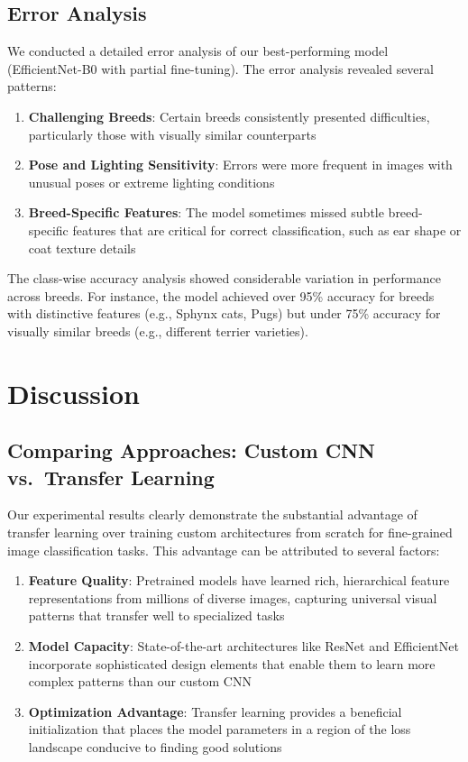 \documentclass[
]{article}
\providecommand{\tightlist}{%
  \setlength{\itemsep}{0pt}\setlength{\parskip}{0pt}}\usepackage{longtable,booktabs,array}
\begin{document}
\subsection{Error Analysis}\label{error-analysis}

We conducted a detailed error analysis of our best-performing model
(EfficientNet-B0 with partial fine-tuning). The error analysis revealed
several patterns:

\begin{enumerate}
\def\labelenumi{\arabic{enumi}.}
\tightlist
\item
  \textbf{Challenging Breeds}: Certain breeds consistently presented
  difficulties, particularly those with visually similar counterparts
\item
  \textbf{Pose and Lighting Sensitivity}: Errors were more frequent in
  images with unusual poses or extreme lighting conditions
\item
  \textbf{Breed-Specific Features}: The model sometimes missed subtle
  breed-specific features that are critical for correct classification,
  such as ear shape or coat texture details
\end{enumerate}

The class-wise accuracy analysis showed considerable variation in
performance across breeds. For instance, the model achieved over 95\%
accuracy for breeds with distinctive features (e.g., Sphynx cats, Pugs)
but under 75\% accuracy for visually similar breeds (e.g., different
terrier varieties).

\section{Discussion}\label{discussion}

\subsection{Comparing Approaches: Custom CNN vs.~Transfer
Learning}\label{comparing-approaches-custom-cnn-vs.-transfer-learning}

Our experimental results clearly demonstrate the substantial advantage
of transfer learning over training custom architectures from scratch for
fine-grained image classification tasks. This advantage can be
attributed to several factors:

\begin{enumerate}
\def\labelenumi{\arabic{enumi}.}
\tightlist
\item
  \textbf{Feature Quality}: Pretrained models have learned rich,
  hierarchical feature representations from millions of diverse images,
  capturing universal visual patterns that transfer well to specialized
  tasks
\item
  \textbf{Model Capacity}: State-of-the-art architectures like ResNet
  and EfficientNet incorporate sophisticated design elements that enable
  them to learn more complex patterns than our custom CNN
\item
  \textbf{Optimization Advantage}: Transfer learning provides a
  beneficial initialization that places the model parameters in a region
  of the loss landscape conducive to finding good solutions
\end{enumerate}
\end{document}
